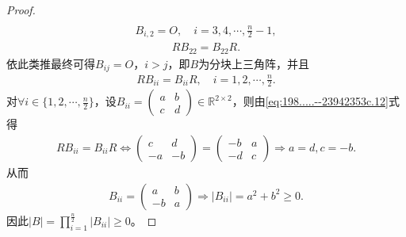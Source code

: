 \documentclass[../../main.tex]{subfiles}
\begin{document}
\begin{proof}
\begin{align*}
\end{align*}
\begin{align*}
B_{i,2} = O, \quad i = 3,4,\cdots,\frac{n}{2}-1,
\end{align*}
\begin{align*}
RB_{22} = B_{22}R.
\end{align*}
依此类推最终可得\(B_{ij} = O\)，\(i > j\)，即\(B\)为分块上三角阵，并且
\begin{align}
RB_{ii} = B_{ii}R, \quad i = 1,2,\cdots,\frac{n}{2}. \label{eq:198.....--23942353c.12}
\end{align}
对\(\forall i \in \{1,2,\cdots,\frac{n}{2}\}\)，设\(B_{ii} = \begin{pmatrix} a & b \\ c & d \end{pmatrix} \in \mathbb{R}^{2 \times 2}\)，则由\eqref{eq:198.....--23942353c.12}式得
\begin{align*}
RB_{ii} = B_{ii}R \Longleftrightarrow \begin{pmatrix} c & d \\ -a & -b \end{pmatrix} = \begin{pmatrix} -b & a \\ -d & c \end{pmatrix} \Longrightarrow a = d, c = -b.
\end{align*}
从而
\begin{align*}
B_{ii} = \begin{pmatrix} a & b \\ -b & a \end{pmatrix} \Longrightarrow |B_{ii}| = a^2 + b^2 \geqslant 0.
\end{align*}
因此\(|B| = \prod_{i=1}^{\frac{n}{2}} |B_{ii}| \geqslant 0\)。


\end{proof}
\end{document}
